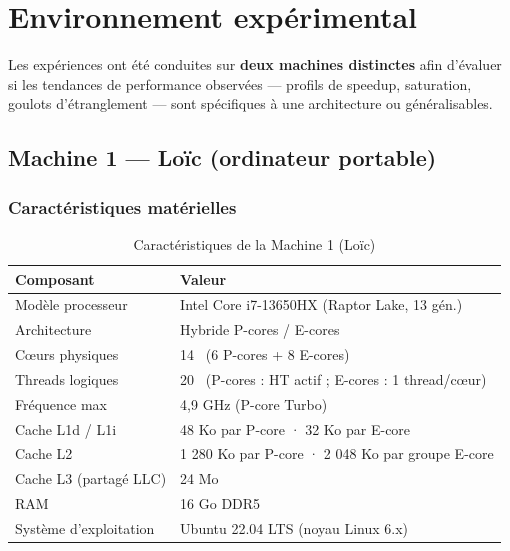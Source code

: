 \chapter{Environnement expérimental}
\label{chap:env}

Les expériences ont été conduites sur \textbf{deux machines distinctes} afin
d'évaluer si les tendances de performance observées — profils de speedup, saturation,
goulots d'étranglement — sont spécifiques à une architecture ou généralisables.

\section{Machine 1 — Loïc (ordinateur portable)}

\subsection{Caractéristiques matérielles}

\begin{table}[h]
\centering
\caption{Caractéristiques de la Machine 1 (Loïc)}
\label{tab:machine1}
\begin{tabular}{ll}
\hline
\textbf{Composant}        & \textbf{Valeur} \\
\hline
Modèle processeur         & Intel Core i7-13650HX (Raptor Lake, 13\ieme{} gén.) \\
Architecture              & Hybride P-cores / E-cores \\
Cœurs physiques           & 14 \ (6 P-cores + 8 E-cores) \\
Threads logiques          & 20 \ (P-cores : HT actif ; E-cores : 1 thread/cœur) \\
Fréquence max             & 4,9 GHz (P-core Turbo) \\
Cache L1d / L1i           & 48 Ko par P-core · 32 Ko par E-core \\
Cache L2                  & 1 280 Ko par P-core · 2 048 Ko par groupe E-core \\
Cache L3 (partagé LLC)    & 24 Mo \\
RAM                       & 16 Go DDR5 \\
Système d'exploitation    & Ubuntu 22.04 LTS (noyau Linux 6.x) \\
\hline
\end{tabular}
\end{table}

